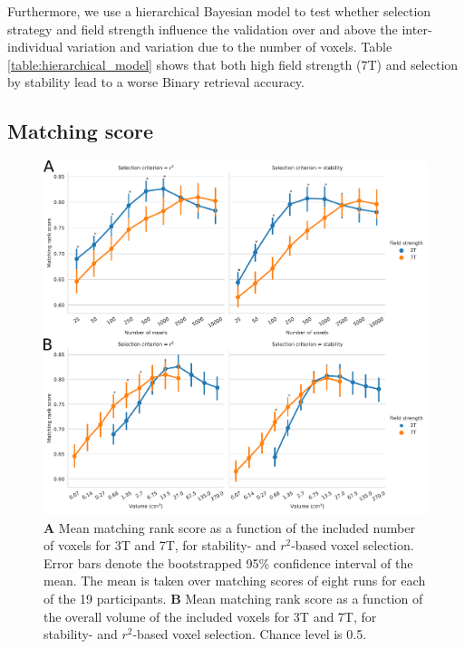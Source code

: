 Furthermore, we use a hierarchical Bayesian model to test whether selection strategy and field strength influence the validation over and above the inter-individual variation and variation due to the number of voxels.
Table \ref{table:hierarchical_model} shows that both high field strength (7T) and selection by stability lead to a worse Binary retrieval accuracy.

\subsection*{Matching score}

\begin{figure}[!htb]
  \centering
    \includegraphics[width=\linewidth]{pics/rank.pdf}
	
  \caption{\textbf{A} Mean matching rank score as a function of the included number
  of voxels for 3T and 7T, for stability- and $r^2$-based voxel selection.
  Error bars denote the bootstrapped 95\% confidence interval of the mean. The
  mean is taken over matching scores of eight runs for each of the
  19 participants. \textbf{B} Mean matching rank score as a function of the overall
volume of the included voxels for 3T and 7T, for stability- and
$r^2$-based voxel selection. Chance level is 0.5.}

 \label{fig:matching_score}
\end{figure}



